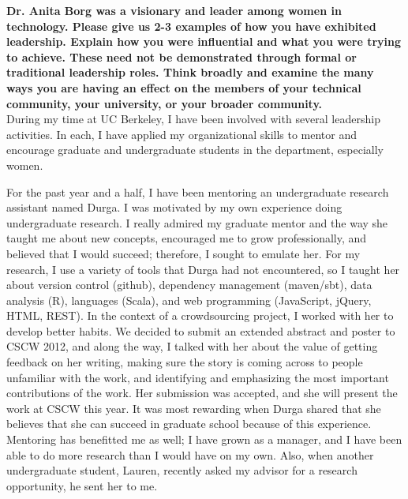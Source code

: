 \documentclass{article}
\begin{document}
	
\pagestyle{plain}

\textbf{Dr. Anita Borg was a visionary and leader among women in technology. Please give us 2-3 examples of how you have exhibited leadership. Explain how you were influential and what you were trying to achieve. These need not be demonstrated through formal or traditional leadership roles. Think broadly and examine the many ways you are having an effect on the members of your technical community, your university, or your broader community.}\\

During my time at UC Berkeley, I have been involved with several leadership activities.
In each, I have applied my organizational skills to mentor and encourage graduate and undergraduate students in the department, especially women.

For the past year and a half, I have been mentoring an undergraduate research assistant named Durga.
I was motivated by my own experience doing undergraduate research.
I really admired my graduate mentor and the way she taught me about new concepts, encouraged me to grow professionally, and believed that I would succeed; therefore, I sought to emulate her.
For my research, I use a variety of tools that Durga had not encountered, so I taught her about version control (github), dependency management (maven/sbt), data analysis (R), languages (Scala), and web programming (JavaScript, jQuery, HTML, REST).
In the context of a crowdsourcing project, I worked with her to develop better habits.
We decided to submit an extended abstract and poster to CSCW 2012, and along the way, I talked with her about the value of getting feedback on her writing, making sure the story is coming across to people unfamiliar with the work, and identifying and emphasizing the most important contributions of the work.
Her submission was accepted, and she will present the work at CSCW this year.
It was most rewarding when Durga shared that she believes that she can succeed in graduate school because of this experience.
Mentoring has benefitted me as well; I have grown as a manager, and I have been able to do more research than I would have on my own.
Also, when another undergraduate student, Lauren, recently asked my advisor for a research opportunity, he sent her to me.
\end{document}
